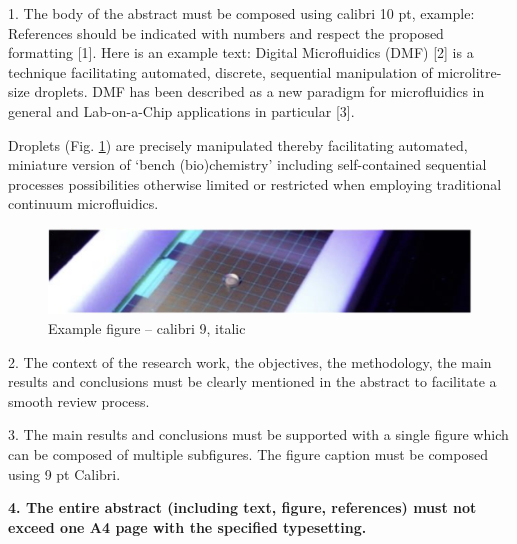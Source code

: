 \documentclass{article}
\begin{document}




1. The body of the abstract must be composed using calibri 10 pt, example: References should be indicated with numbers and respect the proposed formatting [1]. Here is an example text: Digital Microfluidics (DMF) [2] is a technique facilitating automated, discrete, sequential manipulation of microlitre-size droplets. DMF has been described as a new paradigm for microfluidics in general and Lab-on-a-Chip applications in particular [3].

Droplets (Fig. \ref{fig:main_figure}) are precisely manipulated thereby facilitating automated, miniature version of ‘bench (bio)chemistry’ including self-contained sequential processes possibilities otherwise limited or restricted when employing traditional continuum microfluidics.

\begin{figure}[h!]
\centering
  \includegraphics[width=\linewidth]{main_figure.png}
  \caption{
    Example figure – calibri 9, italic
  }
\label{fig:main_figure}
\end{figure}

2. The context of the research work, the objectives, the methodology, the main results and conclusions must be clearly mentioned in the abstract to facilitate a smooth review process.

3. The main results and conclusions must be supported with a single figure which can be composed of multiple subfigures. The figure caption must be composed using {\small 9 pt Calibri}.

\textbf{4. The entire abstract (including text, figure, references) must not exceed one A4 page with the specified typesetting.}
\end{document}
